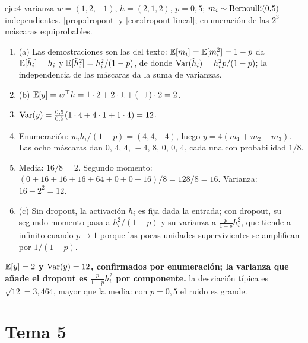 \begin{solucion}{eje:4-varianza}
\datos $w=(1,2,-1)$, $h=(2,1,2)$, $p=0{,}5$; $m_i\sim\operatorname{Bernoulli}(0{,}5)$ independientes.
\planteamiento \cref{prop:dropout} y \cref{cor:dropout-lineal}; enumeración de las $2^{3}$ máscaras equiprobables.
\pasos
\begin{enumerate}[label=\arabic*.]
  \item (a) Las demostraciones son las del texto: $\mathbb{E}[m_i]=\mathbb{E}[m_i^{2}]=1-p$ da $\mathbb{E}[\tilde h_i]=h_i$ y $\mathbb{E}[\tilde h_i^{2}]=h_i^{2}/(1-p)$, de donde $\operatorname{Var}(\tilde h_i)=h_i^{2}p/(1-p)$; la independencia de las máscaras da la suma de varianzas.
  \item (b) $\mathbb{E}[y]=w^{\top} h=1\cdot 2+2\cdot 1+(-1)\cdot 2=2$.
  \item $\operatorname{Var}(y)=\frac{0{,}5}{0{,}5}(1\cdot 4+4\cdot 1+1\cdot 4)=12$.
  \item Enumeración: $w_ih_i/(1-p)=(4,4,-4)$, luego $y=4(m_1+m_2-m_3)$. Las ocho máscaras dan $0,\,4,\,4,\,-4,\,8,\,0,\,0,\,4$, cada una con probabilidad $1/8$.
  \item Media: $16/8=2$. Segundo momento: $(0+16+16+16+64+0+0+16)/8=128/8=16$. Varianza: $16-2^{2}=12$.
  \item (c) Sin dropout, la activación $h_i$ es fija dada la entrada; con dropout, su segundo momento pasa a $h_i^{2}/(1-p)$ y su varianza a $\frac{p}{1-p}h_i^{2}$, que tiende a infinito cuando $p\to 1$ porque las pocas unidades supervivientes se amplifican por $1/(1-p)$.
\end{enumerate}
\resultado \textbf{$\mathbb{E}[y]=2$ y $\operatorname{Var}(y)=12$, confirmados por enumeración; la varianza que añade el dropout es $\frac{p}{1-p}h_i^{2}$ por componente.}
\comprobacion la desviación típica es $\sqrt{12}=3{,}464$, mayor que la media: con $p=0{,}5$ el ruido es grande.
\end{solucion}

\section{Tema 5}

